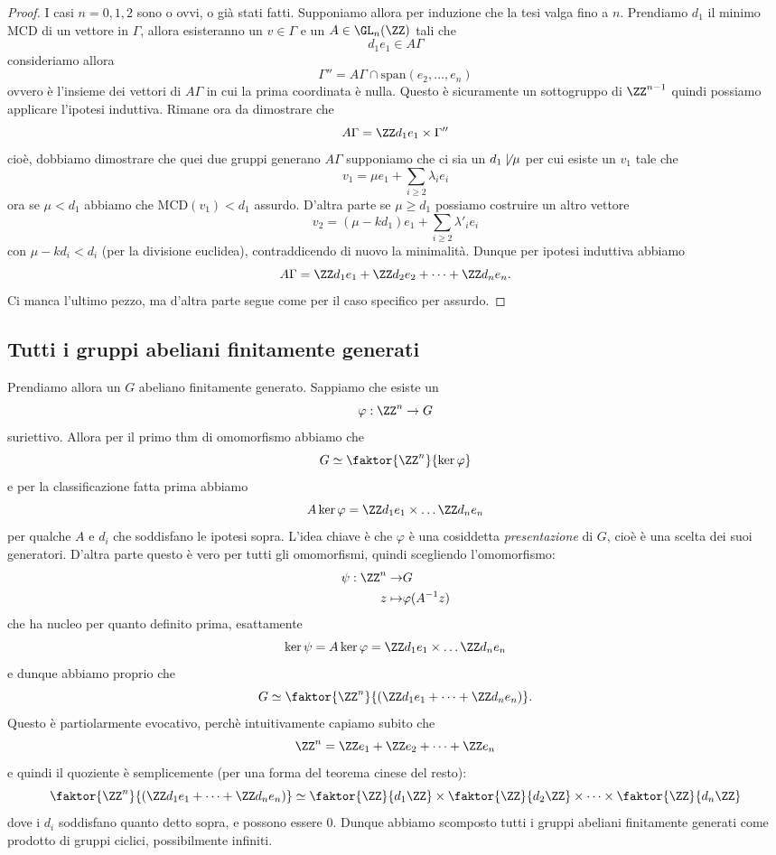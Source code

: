 \documentclass[11pt]{scrartcl}
\begin{document}
	\begin{proof}
		I casi $n=0,1,2$ sono o ovvi, o già stati fatti. Supponiamo allora per induzione che la tesi valga fino a $n$. Prendiamo $d_1$ il minimo MCD di un vettore in $\Gamma$, allora esisteranno un $v\in\Gamma$ e un $A\in \GL_n(\ZZ)$ tali che 
		$$d_1e_1\in A\Gamma$$
		consideriamo allora 
		$$\Gamma''=A\Gamma \cap \text{span}(e_2,\dots,e_n)$$
		ovvero è l'insieme dei vettori di $A\Gamma$ in cui la prima coordinata è nulla. Questo è sicuramente un sottogruppo di $\ZZ^{n-1}$ quindi possiamo applicare l'ipotesi induttiva. Rimane ora da dimostrare che  
		$$A\Gamma=\ZZ d_1e_1 \times \Gamma''$$
		cioè, dobbiamo dimostrare che quei due gruppi generano $A\Gamma$ supponiamo che ci sia un $d_1\not\mid\mu$ per cui esiste un $v_1$ tale che
		$$v_1=\mu e_1+\sum_{i\ge 2}\lambda_i e_i$$
		ora se $\mu<d_1$ abbiamo che $\text{MCD}(v_1)<d_1$ assurdo. D'altra parte se $\mu\ge d_1$ possiamo costruire un altro vettore 
		$$v_2=(\mu-kd_1)e_1+\sum_{i\ge 2}\lambda'_i e_i$$
		con $\mu-kd_i<d_i$ (per la divisione euclidea), contraddicendo di nuovo la minimalità. Dunque per ipotesi induttiva abbiamo
		$$A\Gamma=\ZZ d_1e_1+ \ZZ d_2e_2+ \dots + \ZZ d_n e_n. $$
		Ci manca l'ultimo pezzo, ma d'altra parte segue come per il caso specifico per assurdo.
	\end{proof}
	
	\subsection{Tutti i gruppi abeliani finitamente generati}
	
	Prendiamo allora un $G$ abeliano finitamente generato. Sappiamo che esiste un
	$$\varphi:\ZZ^n\to G$$
	suriettivo. Allora per il primo thm di omomorfismo abbiamo che 
	$$G\simeq \faktor{\ZZ^n}{\ker\varphi}$$
	e per la classificazione fatta prima abbiamo 
	$$A\ker \varphi=\ZZ d_1e_1\times \dots \ZZ d_ne_n$$
	per qualche $A$ e $d_i$ che soddisfano le ipotesi sopra. L'idea chiave è che $\varphi$ è una cosiddetta \textit{presentazione} di $G$, cioè è una scelta dei suoi generatori. D'altra parte questo è vero per tutti gli omomorfismi, quindi scegliendo l'omomorfismo:
	\begin{align*}
		\psi:\ZZ^n\to & G\\
		z \mapsto & \varphi(A^{-1}z)
	\end{align*}
	che ha nucleo per quanto definito prima, esattamente
	$$\ker \psi=A\ker \varphi=\ZZ d_1e_1\times \dots \ZZ d_ne_n$$
	e dunque abbiamo proprio che
	$$G\simeq \faktor{\ZZ^n}{\left(\ZZ d_1e_1+ \dots + \ZZ d_n e_n\right)}.$$
	Questo è partiolarmente evocativo, perchè intuitivamente capiamo subito che 
	$$\ZZ^n=\ZZ e_1+ \ZZ e_2+\dots+\ZZ e_n$$
	e quindi il quoziente è semplicemente (per una forma del teorema cinese del resto):
	$$\faktor{\ZZ^n}{\left(\ZZ d_1e_1+ \dots + \ZZ d_n e_n\right)}\simeq \faktor{\ZZ}{d_1\ZZ}\times \faktor{\ZZ}{d_2\ZZ}\times \dots \times \faktor{\ZZ}{d_n\ZZ}$$
	dove i $d_i$ soddisfano quanto detto sopra, e possono essere $0$. Dunque abbiamo scomposto tutti i gruppi abeliani finitamente generati come prodotto di gruppi ciclici, possibilmente infiniti.
	\newpage
	
\end{document}

